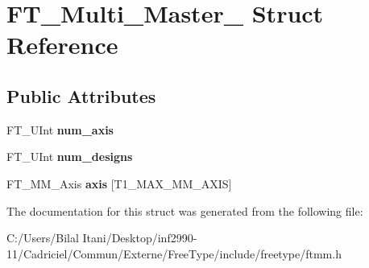 \hypertarget{struct_f_t___multi___master__}{}\section{F\+T\+\_\+\+Multi\+\_\+\+Master\+\_\+ Struct Reference}
\label{struct_f_t___multi___master__}
\subsection*{Public Attributes}
\begin{DoxyCompactItemize}
\item 
F\+T\+\_\+\+U\+Int {\bfseries num\+\_\+axis}\hypertarget{struct_f_t___multi___master___a90a0ace4e40b91912259ad52fc86fb6f}{}\label{struct_f_t___multi___master___a90a0ace4e40b91912259ad52fc86fb6f}

\item 
F\+T\+\_\+\+U\+Int {\bfseries num\+\_\+designs}\hypertarget{struct_f_t___multi___master___a78b797ee560f4b00795a7dce9656178d}{}\label{struct_f_t___multi___master___a78b797ee560f4b00795a7dce9656178d}

\item 
F\+T\+\_\+\+M\+M\+\_\+\+Axis {\bfseries axis} \mbox{[}T1\+\_\+\+M\+A\+X\+\_\+\+M\+M\+\_\+\+A\+X\+IS\mbox{]}\hypertarget{struct_f_t___multi___master___a1eb062ff3b5ac245ab9421a46b349818}{}\label{struct_f_t___multi___master___a1eb062ff3b5ac245ab9421a46b349818}

\end{DoxyCompactItemize}


The documentation for this struct was generated from the following file\+:\begin{DoxyCompactItemize}
\item 
C\+:/\+Users/\+Bilal Itani/\+Desktop/inf2990-\/11/\+Cadriciel/\+Commun/\+Externe/\+Free\+Type/include/freetype/ftmm.\+h\end{DoxyCompactItemize}
